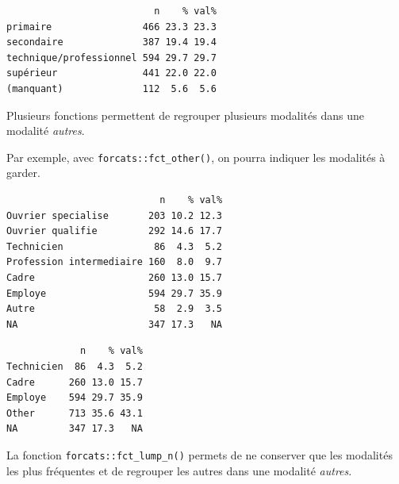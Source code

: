 \documentclass[
  letterpaper,
  DIV=11,
  numbers=noendperiod,
  oneside]{scrreprt}
\newenvironment{Shaded}{\begin{snugshade}}{\end{snugshade}}
\newcommand{\AttributeTok}[1]{\textcolor[rgb]{0.40,0.45,0.13}{#1}}
\newcommand{\FunctionTok}[1]{\textcolor[rgb]{0.28,0.35,0.67}{#1}}
\newcommand{\NormalTok}[1]{\textcolor[rgb]{0.00,0.23,0.31}{#1}}
\newcommand{\SpecialCharTok}[1]{\textcolor[rgb]{0.37,0.37,0.37}{#1}}
\newcommand{\StringTok}[1]{\textcolor[rgb]{0.13,0.47,0.30}{#1}}
\begin{document}
\begin{verbatim}
                          n    % val%
primaire                466 23.3 23.3
secondaire              387 19.4 19.4
technique/professionnel 594 29.7 29.7
supérieur               441 22.0 22.0
(manquant)              112  5.6  5.6
\end{verbatim}

Plusieurs fonctions permettent de regrouper plusieurs modalités dans une
modalité \emph{autres}.

Par exemple, avec \texttt{forcats::fct\_other()}, on pourra indiquer les
modalités à garder.

\begin{Shaded}
\end{Shaded}

\begin{verbatim}
                           n    % val%
Ouvrier specialise       203 10.2 12.3
Ouvrier qualifie         292 14.6 17.7
Technicien                86  4.3  5.2
Profession intermediaire 160  8.0  9.7
Cadre                    260 13.0 15.7
Employe                  594 29.7 35.9
Autre                     58  2.9  3.5
NA                       347 17.3   NA
\end{verbatim}

\begin{Shaded}
\end{Shaded}

\begin{verbatim}
             n    % val%
Technicien  86  4.3  5.2
Cadre      260 13.0 15.7
Employe    594 29.7 35.9
Other      713 35.6 43.1
NA         347 17.3   NA
\end{verbatim}

La fonction \texttt{forcats::fct\_lump\_n()} permets de ne conserver que
les modalités les plus fréquentes et de regrouper les autres dans une
modalité \emph{autres}.
\end{document}

